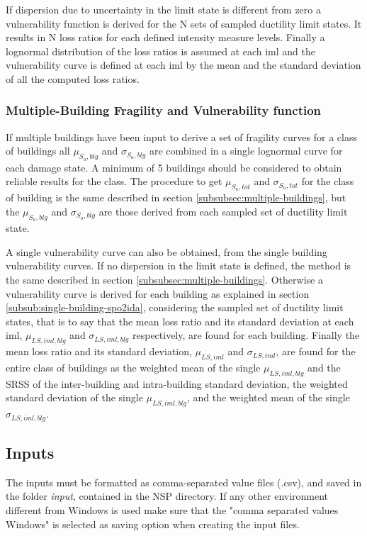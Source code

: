 If dispersion due to uncertainty in the limit state is different from zero a vulnerability function is derived for the N sets of sampled ductility limit states. It results in N loss ratios for each defined intensity measure levels. Finally a lognormal distribution of the loss ratios is assumed at each iml and the vulnerability curve is defined at each iml by the mean and the standard deviation of all the computed loss ratios.

\subsubsection{Multiple-Building Fragility and Vulnerability function}
\label{multiple-building-spo2ida}
If multiple buildings have been input to derive a set of fragility curves for a class of buildings all $\mu_{S_a,blg}$ and $\sigma_{S_a,blg}$ are combined in a single lognormal curve for each damage state. A minimum of 5 buildings should be considered to obtain reliable results for the class. The procedure to get $\mu_{S_a,tot}$ and $\sigma_{S_a,tot}$ for the class of building is the same described in section \ref{subsubsec:multiple-buildings}, but the $\mu_{S_a,blg}$ and $\sigma_{S_a,blg}$ are those derived from each sampled set of ductility limit state.

A single vulnerability curve can also be obtained, from the single building vulnerability curves. If no dispersion in the limit state is defined, the method is the same described in section \ref{subsubsec:multiple-buildings}. Otherwise a vulnerability curve is derived for each building as explained in section \ref{subsub:single-building-spo2ida}, considering the sampled set of ductility limit states, that is to say that the mean loss ratio and its standard deviation at each iml, $\mu_{LS,iml,blg}$ and $\sigma_{LS,iml,blg}$ respectively, are found for each building.
Finally the mean loss ratio and its standard deviation, $\mu_{LS,iml}$ and $\sigma_{LS,iml}$, are found for the entire class of buildings as the weighted mean of the single $\mu_{LS,iml,blg}$ and the SRSS of the inter-building and intra-building standard deviation, the weighted standard deviation of the single $\mu_{LS,iml,blg}$, and the weighted mean of the single $\sigma_{LS,iml,blg}$.

\subsection{Inputs}
\label{subsec:InputSpo2ida}
The inputs must be formatted as comma-separated value files (.csv), and saved in the folder \textit{input}, contained in the NSP directory. If any other environment different from Windows is used make sure that the "comma separated values Windows" is selected as saving option when creating the input files. 

